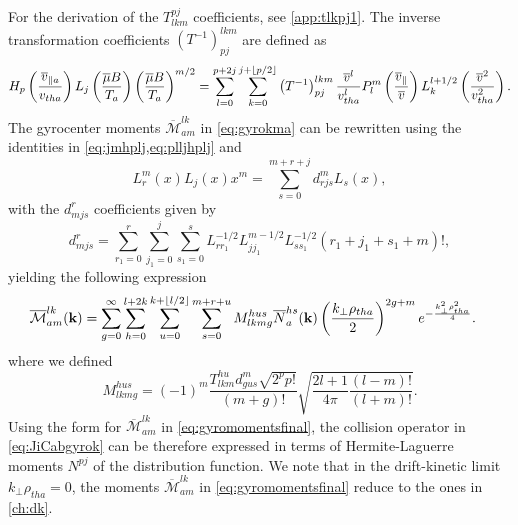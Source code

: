 %
For the derivation of the $T_{lkm}^{pj}$ coefficients, see \cref{app:tlkpj1}.
%
The inverse transformation coefficients $\left(T^{-1}\right)_{pj}^{lkm}$ are defined as
%
\begin{equation}
    H_p\left(\frac{\overline v_{\parallel a}}{v_{tha}}\right)L_j\left(\frac{\overline \mu B}{T_a}\right)\left(\frac{\overline \mu B}{T_a}\right)^{m/2}=\sum_{l=0}^{p+2j}\sum_{k=0}^{j+\lfloor p/2\rfloor}\left(T^{-1}\right)_{pj}^{lkm}\frac{\overline v^l}{v_{tha}^l} P_l^m\left(\frac{\overline v_\parallel}{\overline v}\right) L_k^{l+1/2}\left(\frac{\overline v^2}{v_{tha}^2}\right).
\label{eq:plljhpljminus1}
\end{equation}
%
The gyrocenter moments $\overline{\mathcal{M}}^{lk}_{am}$ in \cref{eq:gyrokma} can be rewritten using the identities in \cref{eq:jmhplj,eq:plljhplj} and
%
\begin{equation}
    L_r^m(x)L_j(x)x^m = \sum_{s=0}^{m+r+j}d^m_{rjs} L_s(x),
\label{eq:doubleLaguerre}
\end{equation}
%
with the $d^r_{mjs}$ coefficients given by
%
\begin{equation}
    d^r_{mjs}=\sum_{r_1=0}^r \sum_{j_1=0}^j \sum_{s_1=0}^s L_{r r_1}^{-1/2} L_{j j_1}^{m-1/2} L_{s s_1}^{-1/2} (r_1+j_1+s_1+m)!,
\end{equation}
%
yielding the following expression
%
\begin{align}
    \overline{\mathcal{M}}_{am}^{lk}(\mathbf k)&=\sum_{g=0}^\infty\sum_{h=0}^{l+2k}\sum_{u=0}^{k+\lfloor l/2\rfloor}\sum_{s=0}^{m+r+u}M_{lkmg}^{hus} \overline N_{a}^{hs}(\mathbf k)\left(\frac{k_\perp \rho_{tha}}{2}\right)^{2g+m}e^{-\frac{k_\perp^2 \rho_{tha}^2}{4}}.
\label{eq:gyromomentsfinal}
\end{align}
%
where we defined
%
\begin{equation}
    M_{lkmg}^{hus}=(-1)^m\frac{T_{lkm}^{hu} d_{gus}^m \sqrt{2^p p!}}{(m+g)!}\sqrt{\frac{2l+1}{4\pi}\frac{(l-m)!}{(l+m)!}}.
\end{equation}
%
Using the form for $\overline{\mathcal{M}}_{am}^{lk}$ in \cref{eq:gyromomentsfinal}, the collision operator in \cref{eq:JiCabgyrok} can be therefore expressed in terms of Hermite-Laguerre moments $N^{pj}$ of the distribution function.
%
We note that in the drift-kinetic limit $k_\perp \rho_{tha}=0$, the moments $ \overline{\mathcal{M}}_{am}^{lk}$ in \cref{eq:gyromomentsfinal} reduce to the ones in \cref{ch:dk}.

